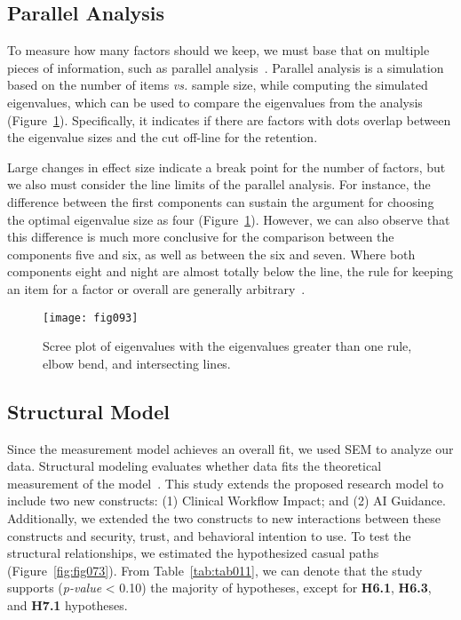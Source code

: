 \subsection{Parallel Analysis}
\label{sec:chap004005006}

To measure how many factors should we keep, we must base that on multiple pieces of information, such as parallel analysis~\cite{doi:10.1080/10705511.2019.1615835}.
Parallel analysis is a simulation based on the number of items {\it vs.} sample size, while computing the simulated eigenvalues, which can be used to compare the eigenvalues from the analysis (Figure~\ref{fig:fig093}).
Specifically, it indicates if there are factors with dots overlap between the eigenvalue sizes and the cut off-line for the retention.

Large changes in effect size indicate a break point for the number of factors, but we also must consider the line limits of the parallel analysis.
For instance, the difference between the first components can sustain the argument for choosing the optimal eigenvalue size as four (Figure~\ref{fig:fig093}).
However, we can also observe that this difference is much more conclusive for the comparison between the components five and six, as well as between the six and seven.
Where both components eight and night are almost totally below the line, the rule for keeping an item for a factor or overall are generally arbitrary~\cite{doi:10.1207/S15328031US0201}.

\begin{figure}
\centering
\texttt{[image: fig093]}
\caption{Scree plot of eigenvalues with the eigenvalues greater than one rule, elbow bend, and intersecting lines.}
\label{fig:fig093}
\end{figure}

\subsection{Structural Model}
\label{sec:chap004005003}

Since the measurement model achieves an overall fit, we used SEM to analyze our data.
Structural modeling evaluates whether data fits the theoretical measurement of the model~\cite{doi:10.1080/10705511.2017.1401932}.
This study extends the proposed research model to include two new constructs:
(1) Clinical Workflow Impact; and
(2) AI Guidance.
Additionally, we extended the two constructs to new interactions between these constructs and security, trust, and behavioral intention to use.
To test the structural relationships, we estimated the hypothesized casual paths (Figure~\ref{fig:fig073}).
From Table~\ref{tab:tab011}, we can denote that the study supports ({\it p-value} < 0.10) the majority of hypotheses, except for {\bf H6.1}, {\bf H6.3}, and {\bf H7.1} hypotheses.

